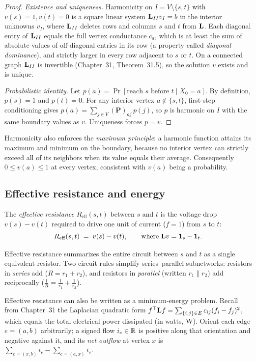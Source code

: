 \begin{proof}
\emph{Existence and uniqueness.} Harmonicity on $I=V\setminus\{s,t\}$ with $v(s)=1,v(t)=0$ is a square linear system $\mathbf{L}_{II}v_I = b$ in the interior unknowns $v_I$, where $\mathbf{L}_{II}$ deletes rows and columns $s$ and $t$ from $\mathbf{L}$. Each diagonal entry of $\mathbf{L}_{II}$ equals the full vertex conductance $c_a$, which is at least the sum of absolute values of off-diagonal entries in its row (a property called \emph{diagonal dominance}), and strictly larger in every row adjacent to $s$ or $t$. On a connected graph $\mathbf{L}_{II}$ is invertible (Chapter~31, Theorem~31.5), so the solution $v$ exists and is unique.

\emph{Probabilistic identity.} Let $p(a)=\Pr[\text{reach }s\text{ before }t\mid X_0=a]$. By definition, $p(s)=1$ and $p(t)=0$. For any interior vertex $a\notin\{s,t\}$, first-step conditioning gives $p(a)=\sum_{j\in V}(\mathbf{P})_{aj}\,p(j)$, so $p$ is harmonic on $I$ with the same boundary values as $v$. Uniqueness forces $p=v$.
\end{proof}

Harmonicity also enforces the \emph{maximum principle}: a harmonic function attains its maximum and minimum on the boundary, because no interior vertex can strictly exceed all of its neighbors when its value equals their average. Consequently $0\le v(a)\le 1$ at every vertex, consistent with $v(a)$ being a probability.

\subsection{Effective resistance and energy}

\begin{definition}\label{ch35:def-reff}
The \emph{effective resistance} $R_{\mathrm{eff}}(s,t)$ between $s$ and $t$ is the voltage drop $v(s)-v(t)$ required to drive one unit of current ($f=1$) from $s$ to $t$:
\[
  R_{\mathrm{eff}}(s,t) \;=\; v(s)-v(t), \qquad \text{where } \mathbf{L} v=\mathbf{1}_s-\mathbf{1}_t.
\]
\end{definition}

Effective resistance summarizes the entire circuit between $s$ and $t$ as a single equivalent resistor. Two circuit rules simplify series--parallel subnetworks: resistors in \emph{series} add ($R=r_1+r_2$), and resistors in \emph{parallel} (written $r_1\parallel r_2$) add reciprocally ($\frac1R=\frac1{r_1}+\frac1{r_2}$).

Effective resistance can also be written as a minimum-energy problem. Recall from Chapter~31 the Laplacian quadratic form $f^\top\mathbf{L} f=\sum_{\{i,j\}\in E}c_{ij}(f_i-f_j)^2$, which equals the total electrical power dissipated (in watts, $\text{W}$). Orient each edge $e=(a,b)$ arbitrarily; a signed flow $i_e\in\mathbb{R}$ is positive along that orientation and negative against it, and its \emph{net outflow} at vertex $x$ is $\sum_{e=(x,b)}i_e - \sum_{e=(a,x)}i_e$.

